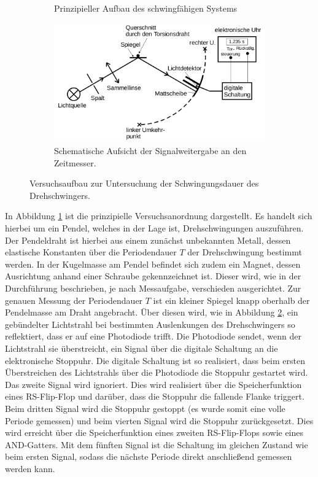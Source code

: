\begin{figure}
\begin{subfigure}[b]{0.3\textwidth}
		\caption{Prinzipieller Aufbau des schwingfähigen Systems}
		\label{fig:pendel}
	\end{subfigure}
	\begin{subfigure}[b]{0.3\textwidth}
		\includegraphics[width=\textwidth]{Bilder/spiegelding.png}
		\caption{Schematische Aufsicht der Signalweitergabe an den Zeitmesser.}
		\label{fig:licht}
	\end{subfigure}
	\caption{Versuchsaufbau zur Untersuchung der Schwingungsdauer des Drehschwingers. \cite{Anleitung}}
	\label{fig:aufbau_schwinger}
\end{figure}
In Abbildung \ref{fig:pendel} ist die prinzipielle Versuchsanordnung dargestellt. Es handelt sich hierbei um ein Pendel, welches in der Lage ist, Drehschwingungen auszuführen. Der Pendeldraht ist hierbei aus einem zunächst unbekannten Metall, dessen elastische Konstanten über die Periodendauer $T$ der Drehschwingung bestimmt werden. In der Kugelmasse am Pendel befindet sich zudem ein Magnet, dessen Ausrichtung anhand einer Schraube gekennzeichnet ist. Dieser wird, wie in der Durchführung beschrieben, je nach Messaufgabe, verschieden ausgerichtet.
Zur genauen Messung der Periodendauer $T$ ist ein kleiner Spiegel knapp oberhalb der Pendelmasse am Draht angebracht.
Über diesen wird, wie in Abbildung \ref{fig:licht}, ein gebündelter Lichtstrahl bei bestimmten Auslenkungen des Drehschwingers so reflektiert, dass er auf eine Photodiode trifft.
Die Photodiode sendet, wenn der Lichtstrahl sie überstreicht, ein Signal über die digitale Schaltung an die elektronische Stoppuhr.
Die digitale Schaltung ist so realisiert, dass beim ersten Überstreichen des Lichtstrahls über die Photodiode die Stoppuhr gestartet wird.
Das zweite Signal wird ignoriert. Dies wird realisiert über die Speicherfunktion eines RS-Flip-Flop und darüber, dass die Stoppuhr die fallende Flanke triggert.
Beim dritten Signal wird die Stoppuhr gestoppt (es wurde somit eine volle Periode gemessen) und beim vierten Signal wird die Stoppuhr zurückgesetzt.
Dies wird erreicht über die Speicherfunktion eines zweiten RS-Flip-Flops sowie eines AND-Gatters. Mit dem fünften Signal ist die Schaltung im gleichen Zustand wie beim ersten Signal, sodass die nächste Periode direkt anschließend gemessen werden kann.

